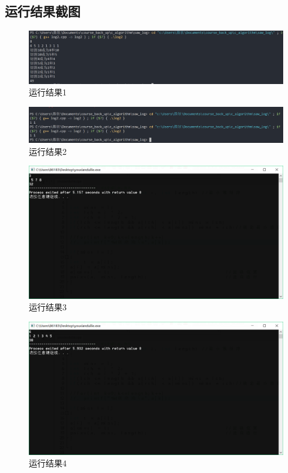 \documentclass[UTF8]{ctexart}
\begin{document}
	\subsection{运行结果截图}
\begin{figure}[h]
	\centering
	\includegraphics[scale=0.6]{result4.png}
	\caption{运行结果1}
\end{figure}
\begin{figure}[h]
	\centering
	\includegraphics[scale=0.6]{result5.png}
	\caption{运行结果2}
\end{figure}
\begin{figure}[h]
	\centering
	\includegraphics[scale=0.6]{result6.png}
	\caption{运行结果3}
\end{figure}
\begin{figure}[h]
	\centering
	\includegraphics[scale=0.6]{result7.png}
	\caption{运行结果4}
\end{figure}
\end{document}
